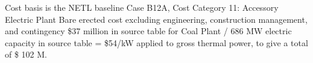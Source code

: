 Cost basis is the NETL baseline Case B12A, Cost Category 11: Accessory Electric Plant Bare erected cost excluding engineering, construction management, and contingency \$37 million in source table for Coal Plant / 686 MW electric capacity in source table = \$54/kW applied to gross  thermal power, to give a total of \$ 102 M.